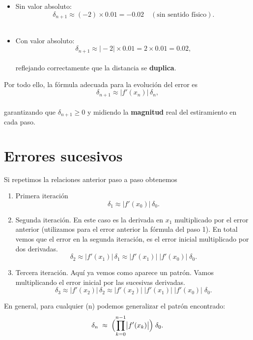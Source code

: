 \documentclass[
  10pt,
  a4paper,
  DIV=11,
  numbers=noendperiod,
  open=any]{scrreprt}
\providecommand{\tightlist}{%
  \setlength{\itemsep}{0pt}\setlength{\parskip}{0pt}}
\numberwithin{equation}{chapter}
\numberwithin{equation}{chapter}
\renewcommand{\[}{\begin{equation}}
\renewcommand{\]}{\end{equation}}
\begin{document}
\begin{itemize}
\tightlist
\item
  Sin valor absoluto:\\
  \[
  \delta_{n+1}\approx(-2)\times0.01=-0.02\quad(\text{sin sentido físico}).
  \]\\
\item
  Con valor absoluto:\\
  \[
  \delta_{n+1}\approx\bigl|-2\bigr|\times0.01=2\times0.01=0.02,
  \]\\
  reflejando correctamente que la distancia se \textbf{duplica}.
\end{itemize}

Por todo ello, la fórmula adecuada para la evolución del error es\\
\[
\delta_{n+1} \approx \bigl|f'(x_n)\bigr|\,\delta_n,
\]\\
garantizando que \(\delta_{n+1}\ge0\) y midiendo la \textbf{magnitud}
real del estiramiento en cada paso.

\section{Errores sucesivos}\label{errores-sucesivos}

Si repetimos la relaciones anterior paso a paso obtenemos

\begin{enumerate}
\def\labelenumi{\arabic{enumi}.}
\item
  Primera iteración\\
  \[
  \delta_1 \approx \bigl|f'(x_0)\bigr|\,\delta_0.
  \]
\item
  Segunda iteración. En este caso es la derivada en \(x_1\) multiplicado
  por el error anterior (utilizamos para el error anterior la fórmula
  del paso 1). En total vemos que el error en la segunda iteración, es
  el error inicial multiplicado por dos derivadas. \[
  \delta_2
  \approx \bigl|f'(x_1)\bigr|\,\delta_1
  \approx \bigl|f'(x_1)\bigr|\;\bigl|f'(x_0)\bigr|\;\delta_0.
  \]
\item
  Tercera iteración. Aquí ya vemos como aparece un patrón. Vamos
  multiplicando el error inicial por las sucesivas derivadas. \[
  \delta_3
  \approx \bigl|f'(x_2)\bigr|\,\delta_2
  \approx \bigl|f'(x_2)\bigr|\;\bigl|f'(x_1)\bigr|\;\bigl|f'(x_0)\bigr|\;\delta_0.
  \]
\end{enumerate}

En general, para cualquier (n) podemos generalizar el patrón
encontrado:\\
\[
\delta_n
\;\approx\;
\Bigl(\prod_{k=0}^{n-1}\bigl|f'(x_k)\bigr|\Bigr)\;\delta_0.
\]
\end{document}
